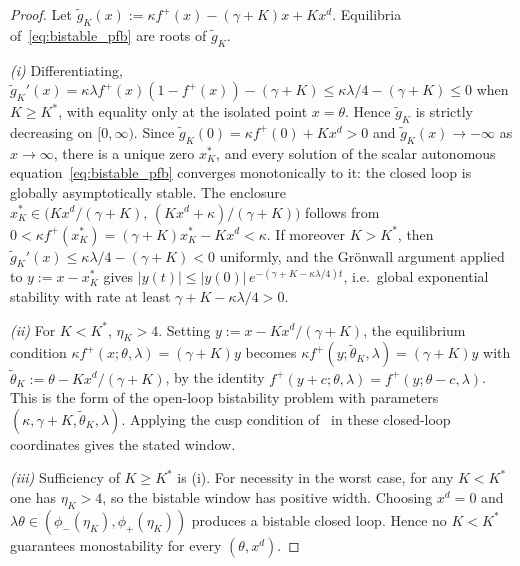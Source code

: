 \documentclass[12pt]{article}
\newcommand{\fplus}{f^{+}}
\begin{document}
\begin{proof}
Let $\tilde g_K(x):=\kappa\fplus(x)-(\gamma+K)x+Kx^{d}$. Equilibria
of~\eqref{eq:bistable_pfb} are roots of $\tilde g_K$.

\smallskip
\emph{(i)} Differentiating,
$\tilde g_K'(x)=\kappa\lambda\fplus(x)(1-\fplus(x))-(\gamma+K)
\le \kappa\lambda/4-(\gamma+K)\le 0$ when $K\ge K^{*}$, with equality
only at the isolated point $x=\theta$. Hence $\tilde g_K$ is strictly
decreasing on $[0,\infty)$. Since $\tilde g_K(0)=\kappa\fplus(0)+Kx^{d}>0$
and $\tilde g_K(x)\to-\infty$ as $x\to\infty$, there is a unique zero
$x_K^{*}$, and every solution of the scalar autonomous
equation~\eqref{eq:bistable_pfb} converges monotonically to it: the
closed loop is globally asymptotically stable. The enclosure
$x_K^{*}\in\bigl(Kx^{d}/(\gamma+K),\,(Kx^{d}+\kappa)/(\gamma+K)\bigr)$
follows from $0<\kappa\fplus(x_K^{*})=(\gamma+K)x_K^{*}-Kx^{d}<\kappa$.
If moreover $K>K^{*}$, then $\tilde g_K'(x)\le\kappa\lambda/4-(\gamma+K)<0$
uniformly, and the Gr\"onwall argument applied to $y:=x-x_K^{*}$ gives
$|y(t)|\le|y(0)|\,e^{-(\gamma+K-\kappa\lambda/4)t}$, i.e.\ global
exponential stability with rate at least $\gamma+K-\kappa\lambda/4>0$.

\smallskip
\emph{(ii)} For $K<K^{*}$, $\eta_K>4$. Setting
$y:=x-Kx^{d}/(\gamma+K)$, the equilibrium condition
$\kappa\fplus(x;\theta,\lambda)=(\gamma+K)y$ becomes
$\kappa\fplus(y;\tilde\theta_{K},\lambda)=(\gamma+K)y$ with
$\tilde\theta_{K}:=\theta-Kx^{d}/(\gamma+K)$, by the identity
$\fplus(y+c;\theta,\lambda)=\fplus(y;\theta-c,\lambda)$. This is the
form of the open-loop bistability problem with parameters
$(\kappa,\gamma+K,\tilde\theta_{K},\lambda)$. Applying the cusp
condition of~\cite{belgacem2026extensions} in these closed-loop
coordinates gives the stated window.

\smallskip
\emph{(iii)} Sufficiency of $K\ge K^{*}$ is (i). For necessity in the
worst case, for any $K<K^{*}$ one has $\eta_{K}>4$, so the bistable
window has positive width. Choosing $x^{d}=0$ and
$\lambda\theta\in(\phi_{-}(\eta_K),\phi_{+}(\eta_K))$ produces a
bistable closed loop. Hence no $K<K^{*}$ guarantees monostability
for every $(\theta,x^{d})$.
\end{proof}
\end{document}
